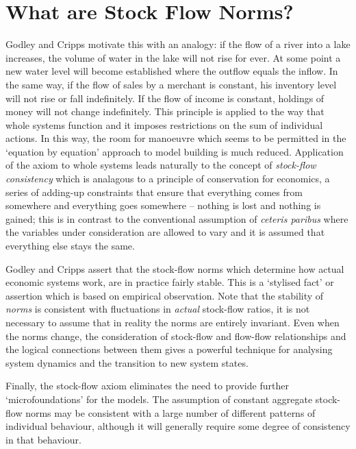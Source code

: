 \documentclass[twoside,a4paper,11pt]{article}
\begin{document}
\section{What are Stock Flow Norms?}
Godley and Cripps motivate this with an analogy: if the flow of a river into  a lake increases, the volume of water in the lake will not rise for ever. At some point a new water level will become established where the outflow equals the inflow. In the same way, if the flow of sales by a merchant is constant, his inventory level will not rise or fall indefinitely. If the flow of income is constant, holdings of money will not change indefinitely. This principle is applied to the way that whole systems function and it imposes restrictions on the sum of individual actions. In this way, the room for manoeuvre which seems to be permitted in the `equation by equation' approach to model building is much reduced. Application of the axiom to whole systems leads naturally to the concept of \emph{stock-flow consistency} which is analagous to a principle of conservation for economics, a series of adding-up constraints that ensure that everything comes from somewhere and everything goes somewhere -- nothing is lost and nothing is gained; this is in contrast to the conventional assumption of \emph{ceteris paribus} where the variables under consideration are allowed to vary and it is assumed that everything else stays the same. 

Godley and Cripps assert that the stock-flow norms which determine how actual economic systems work, are in practice fairly stable. This is a `stylised fact' or assertion which is based on empirical observation. Note that the stability of \emph{norms} is consistent with fluctuations in \emph{actual} stock-flow ratios, it is not necessary to assume that in reality the norms are entirely invariant. Even when the norms change, the consideration of stock-flow and flow-flow relationships and the logical connections between them gives a powerful technique for analysing system dynamics and the transition to new system states.

Finally, the stock-flow axiom eliminates the need to provide further `microfoundations' for the models. The assumption of constant aggregate stock-flow norms may be consistent with a large number of different patterns of individual behaviour, although it will generally require some degree of consistency in that behaviour.
\end{document}
